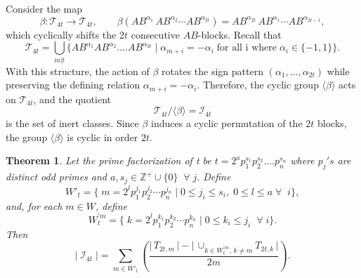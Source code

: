\documentclass[a4paper,12pt]{amsart}
\numberwithin{equation}{section}
\newtheorem{theorem}{Theorem}[section]
\theoremstyle{definition}
\numberwithin{equation}{section}
\begin{document}
Consider the map
$$
\beta : \mathcal{T}_{4t} \longrightarrow \mathcal{T}_{4t}, \qquad\beta\!\left(AB^{\alpha_1}\, AB^{\alpha_2} \cdots AB^{\alpha_{2t}}\right)= AB^{\alpha_{2t}}\, AB^{\alpha_1} \cdots AB^{\alpha_{2t-1}},
$$ which cyclically shifts the $2t$ consecutive $AB$-blocks. Recall that
$$
\mathcal{T}_{4t}=\bigcup_{m \lvert t}\{ AB^{\alpha_1}AB^{\alpha_2}....AB^{\alpha_{2t}} \mid \alpha_{m+i} = -\alpha_i\; \text{for all i where} \; \alpha_i \in \{-1, 1\}\}.
$$
With this structure, the action of $\beta$ rotates the sign pattern 
$(\alpha_1,\ldots,\alpha_{2t})$ while preserving the defining relation 
$\alpha_{m+i} = -\alpha_i$. Therefore, the cyclic group $\langle \beta \rangle$ acts on $\mathcal{T}_{4t}$, and the quotient $$\mathcal{T}_{4t}/\langle \beta \rangle = \mathscr{I}_{4t}$$ is the set of inert classes. Since $\beta$ induces a cyclic permutation of the $2t$ blocks, the group $\langle \beta \rangle$ is cyclic in order $2t$.
\begin{theorem}\label{2.9}
Let the prime factorization of t be $ t=2^ap_1^{s_1}p_2^{s_2}....p_n^{s_n} $ where $p_j's$ are distinct odd primes and $a, s_j \in \mathbb{Z}^+ \cup \{0\} \;\;\forall \; j.$ Define $$W'_t= \{\;m = 2^{l}p_1^{j_1}p_2^{j_2}\cdots p_n^{j_n}\mid 0\leq j_i \leq s_i, \;0\leq l\leq a\;\forall\;\; i\},$$ and, for each $m \in W$, define $$W_{t}^{'m}= \{ \;k = 2^{l}p_1^{k_1}p_2^{k_2}\cdots p_n^{k_n}\mid 0\leq k_i \leq j_i \;\;\forall \; i\}.$$ 
Then
$$ \lvert \;\mathscr{I}_{4t}\;\rvert = \sum_{m \in W'_t} \left ( \frac{\lvert \,T_{2t,m} \,\rvert- \lvert\, \cup_{k\in W_t^{'m},\, k\neq m}T_{2t,k}\,\rvert}{2m}\right).$$
\end{theorem}
\end{document}
